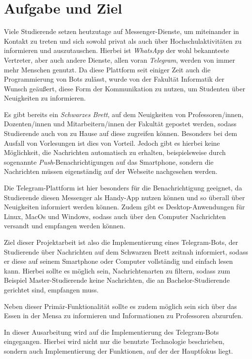 \chapter{Aufgabe und Ziel}
Viele Studierende setzen heutzutage auf Messenger-Dienste, um miteinander in Kontakt zu treten und sich sowohl privat als auch über Hochschulaktivitäten zu informieren und auszutauschen. Hierbei ist \emph{WhatsApp} der wohl bekannteste Vertreter, aber auch andere Dienste, allen voran \emph{Telegram}, werden von immer mehr Menschen genutzt. Da diese Plattform seit einiger Zeit auch die Programmierung von Bots zulässt, wurde von der Fakultät Informatik der Wunsch geäußert, diese Form der Kommunikation zu nutzen, um Studenten über Neuigkeiten zu informieren.

Es gibt bereits ein \emph{Schwarzes Brett}, auf dem Neuigkeiten von Professoren/innen, Dozenten/innen und Mitarbeitern/innen der Fakultät gepostet werden, sodass Studierende auch von zu Hause auf diese zugreifen können. Besonders bei dem Ausfall von Vorlesungen ist dies von Vorteil.
Jedoch gibt es hierbei keine Möglichkeit, die Nachrichten automatisch zu erhalten, beispielsweise durch sogenannte \textit{Push}-Benachrichtigungen auf das Smartphone, sondern die Nachrichten müssen eigenständig auf der Webseite nachgesehen werden.

Die Telegram-Plattform ist hier besonders für die Benachrichtigung geeignet, da Studierende diesen Messenger als Handy-App nutzen können und so überall über Neuigkeiten informiert werden können. Zudem gibt es Desktop-Anwendungen für Linux, MacOs und Windows, sodass auch über den Computer Nachrichten versandt und empfangen werden können.

Ziel dieser Projektarbeit ist also die Implementierung eines Telegram-Bots, der Studierende über Nachrichten auf dem Schwarzen Brett zeitnah informiert, sodass er diese auf seinem Smartphone oder Computer vollständig und einfach lesen kann. Hierbei sollte es möglich sein, Nachrichtenarten zu filtern, sodass zum Beispiel Master-Studierende keine Nachrichten, die an Bachelor-Studierende gerichtet sind, empfangen muss.

Neben dieser Primär-Funktionalität sollte es zudem möglich sein sich über das Essen in der Mensa zu informieren und Informationen zu Professoren abzurufen.

In dieser Ausarbeitung wird auf die Implementierung des Telegram-Bots eingegangen. Hierbei wird nicht nur die benutzte Technologie beschrieben, sondern auch Implementierung der Funktionen, auf der der Hauptfokus liegt.
